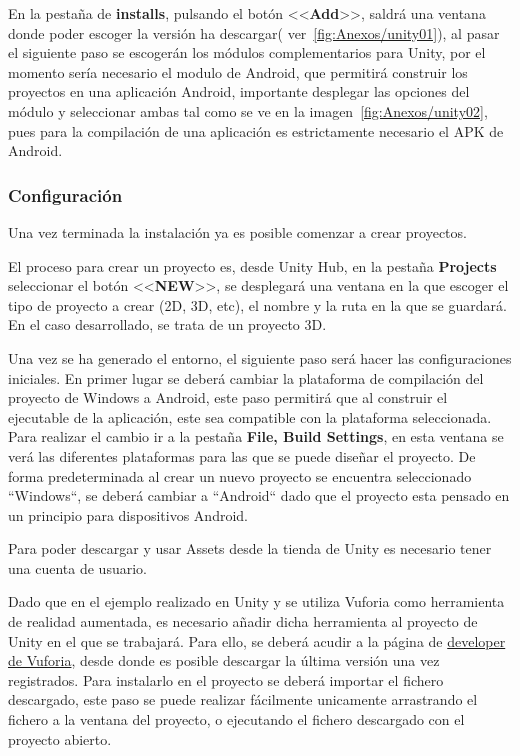 En la pestaña de \textbf{installs}, pulsando el botón <<\textbf{Add}>>, saldrá una ventana donde poder escoger la versión ha descargar( ver~\ref{fig:Anexos/unity01}), al pasar el siguiente paso se escogerán los módulos complementarios para Unity, por el momento sería necesario el modulo de Android, que permitirá construir los proyectos en una aplicación Android, importante desplegar las opciones del módulo y seleccionar ambas tal como se ve en la imagen~\ref{fig:Anexos/unity02}, pues para la compilación de una aplicación es estrictamente necesario el APK de Android.



\label{sub:Confi}\subsubsection{Configuración }

Una vez terminada la instalación ya es posible comenzar a crear proyectos. 

El proceso para crear un proyecto es, desde Unity Hub, en la pestaña \textbf{Projects} seleccionar el botón <<\textbf{NEW}>>, se desplegará una ventana en la que escoger el tipo de proyecto a crear (2D, 3D, etc), el nombre y la ruta en la que se guardará. En el caso desarrollado, se trata de un proyecto 3D.

Una vez se ha generado el entorno, el siguiente paso será hacer las configuraciones iniciales. En primer lugar se deberá cambiar la plataforma de compilación del proyecto de Windows a Android, este paso permitirá que al construir el ejecutable de la aplicación, este sea compatible con la plataforma seleccionada. 
Para realizar el cambio ir a la pestaña \textbf{File, Build Settings}, en esta ventana se verá las diferentes plataformas para las que se puede diseñar el proyecto. De forma predeterminada al crear un nuevo proyecto se encuentra seleccionado ``Windows``, se deberá cambiar a ``Android`` dado que el proyecto esta pensado en un principio para dispositivos Android.

Para poder descargar y usar Assets desde la tienda de Unity es necesario tener una cuenta de usuario.

Dado que en el ejemplo realizado en Unity y se utiliza Vuforia como herramienta de realidad aumentada, es necesario añadir dicha herramienta al proyecto de Unity en el que se trabajará. Para ello, se deberá acudir a la página de \href{https://developer.vuforia.com/downloads/sdk}{developer de Vuforia}, desde donde es posible descargar la última versión una vez registrados. Para instalarlo en el proyecto se deberá importar el fichero descargado, este paso se puede realizar fácilmente unicamente arrastrando el fichero a la ventana del proyecto, o ejecutando el fichero descargado con el proyecto abierto.

